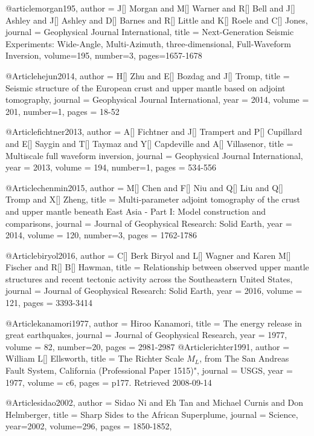@article{morgan195,
author = {J[] Morgan and M[] Warner and R[] Bell and J[] Ashley and J[] Ashley and D[] Barnes and R[] Little and K[] Roele and C[] Jones},
journal = {Geophysical Journal International},
title = {Next-Generation Seismic Experiments: Wide-Angle, Multi-Azimuth, three-dimensional, Full-Waveform Inversion},
volume=195,
number=3,
pages=1657-1678
}

@Article{hejun2014,
  author = 	 {H[] Zhu and E[] Bozdag and J[] Tromp},
  title = 	 {Seismic structure of the European crust and upper mantle based on adjoint tomography},
  journal = 	 {Geophysical Journal International},
  year = 	 2014,
  volume = 201,
  number=1,
  pages =	 {18-52}
}

@Article{fichtner2013,
  author = 	 {A[] Fichtner and J[] Trampert and P[] Cupillard and E[] Saygin and T[] Taymaz and Y[] Capdeville and A[] Villasenor},
  title = 	 {Multiscale full waveform inversion},
  journal = 	 {Geophysical Journal International},
  year = 	 2013,
  volume = 194,
  number=1,
  pages =	 {534-556}
}

@Article{chenmin2015,
  author = 	 {M[] Chen and F[] Niu and Q[] Liu and Q[] Tromp and X[] Zheng},
  title = 	 {Multi‐parameter adjoint tomography of the crust and upper mantle beneath {E}ast {A}sia - {P}art I: {M}odel construction and comparisons},
  journal = 	 {Journal of Geophysical Research: Solid Earth},
  year = 	 2014,
  volume = 120,
  number=3,
  pages =	 {1762-1786}
}


@Article{biryol2016,
  author = 	 {C[] Berk Biryol and L[] Wagner and Karen M[] Fischer and R[] B[] Hawman},
  title = 	 {Relationship between observed upper mantle structures and recent tectonic activity across the Southeastern United States},
  journal = 	 {Journal of Geophysical Research: Solid Earth},
  year = 	 2016,
  volume = 121,
  pages =	 {3393-3414}
}

@Article{kanamori1977,
  author = 	 {Hiroo Kanamori},
  title = 	 {The energy release in great earthquakes},
  journal = 	 {Journal of Geophysical Research},
  year = 	 1977,
  volume = 82,
  number=20,
  pages =	 {2981-2987}
}
@Article{richter1991,
  author = 	 {William L[] Ellsworth},
  title = 	 {The Richter Scale $M_L$, from The San Andreas Fault System, California (Professional Paper 1515)"},
  journal = 	 {USGS},
  year = 	 1977,
  volume = c6,
  pages =	 {p177. Retrieved 2008-09-14}
}



@Article{sidao2002,
  author =	 {Sidao Ni and Eh Tan and Michael Curnis and Don Helmberger},
  title =	 {Sharp Sides to the African Superplume},
  journal =	 {Science},
  year=2002,
  volume=296,
  pages =	 {1850-1852},
}

